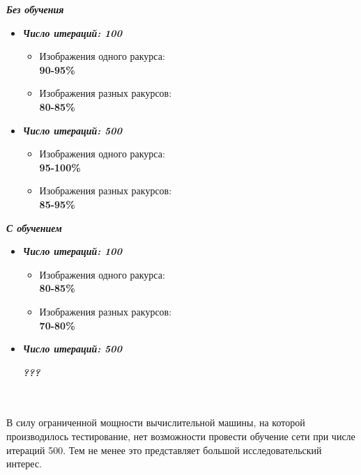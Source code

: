 \documentclass[a4paper, 12pt]{article}
\begin{document}
\begin{minipage}{.50\textwidth}

\textbf{\textit{\Large Без обучения}}
\begin{itemize}
\item \textbf{\textit{Число итераций: 100}}
\begin{itemize}
\item Изображения одного ракурса:\\ \textbf{90-95\%}
\item Изображения разных ракурсов:\\ \textbf{80-85\%}
\end{itemize}
\item \textbf{\textit{Число итераций: 500}}
\begin{itemize}
\item Изображения одного ракурса:\\ \textbf{95-100\%}
\item Изображения разных ракурсов:\\ \textbf{85-95\%}
\end{itemize}
\end{itemize}
\end{minipage}
\begin{minipage}{.50\textwidth}
\vspace{-2.4cm}\textbf{\textit{\Large С обучением}}
\begin{itemize}
\item \textbf{\textit{Число итераций: 100}}
\begin{itemize}
\item Изображения одного ракурса:\\ \textbf{80-85\%}
\item Изображения разных ракурсов:\\ \textbf{70-80\%}
\end{itemize}

\item \textbf{\textit{Число итераций: 500}}

\centering
\textbf{\textit{\Large ???}}
\end{itemize}
\end{minipage}\\\\

В силу ограниченной мощности вычислительной машины, на которой производилось тестирование, нет возможности провести обучение сети при числе итераций 500. Тем не менее это представляет большой исследовательский интерес.
\end{document}
